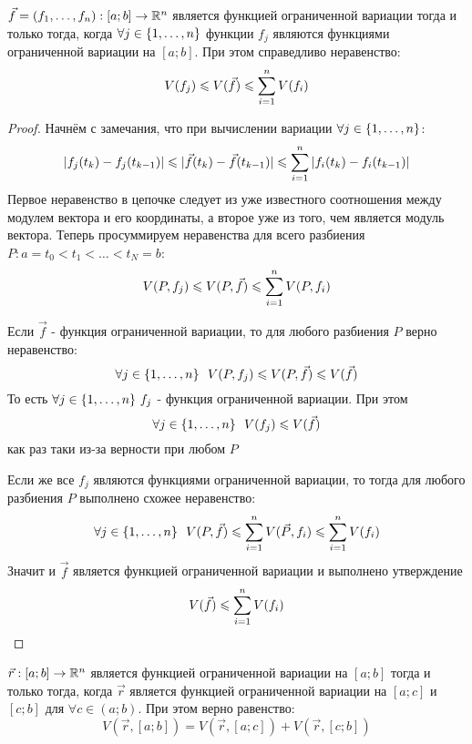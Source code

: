 \begin{lemma} \label{6lemma}
	$\vec{f} = (f_1, \ldots, f_n): [a; b] \to \mathbb{R}^n$ является функцией ограниченной вариации тогда и только тогда, когда $\forall j \in \{1, \ldots, n\}$ функции $f_j$ являются функциями ограниченной вариации на $[a; b]$. При этом справедливо неравенство:
	\[
		V(f_j) \leqslant V(\vec{f}) \leqslant \sum\limits_{i = 1}^n V(f_i)
	\]
\end{lemma}

\begin{proof}
	Начнём с замечания, что при вычислении вариации $\forall j \in \{1, \ldots, n\}$:
	\[
		|f_j(t_k) - f_j(t_{k - 1})| \leqslant |\vec{f}(t_k) - \vec{f}(t_{k - 1})| \leqslant \sum\limits_{i = 1}^n |f_i(t_k) - f_i(t_{k - 1})|
	\]
	Первое неравенство в цепочке следует из уже известного соотношения между модулем вектора и его координаты, а второе уже из того, чем является модуль вектора. Теперь просуммируем неравенства для всего разбиения $P: a = t_0 < t_1 < \ldots < t_N = b$:
	\[
		V(P, f_j) \leqslant V(P, \vec{f}) \leqslant \sum\limits_{i = 1}^n V(P, f_i)
	\]
	
	Если $\vec{f}$ - функция ограниченной вариации, то для любого разбиения $P$ верно неравенство:
	\[
		\forall j \in \range{n}\ \ V(P, f_j) \le V(P, \vec{f}) \le V(\vec{f})
	\]
	То есть $\forall j \in \{1, \ldots, n\}\ f_j$ - функция ограниченной вариации. При этом
	\[
		\forall j \in \{1, \ldots, n\}\ \ V(f_j) \leqslant V(\vec{f})
	\]
	как раз таки из-за верности при любом $P$
	
	Если же все $f_j$ являются функциями ограниченной вариации, то тогда для любого разбиения $P$ выполнено схожее неравенство:
	\[
		\forall j \in \{1, \ldots, n\}\ \ V(P, \vec{f}) \leqslant \sum\limits_{i = 1}^n V(\vec{P}, f_i) \leqslant \sum\limits_{i = 1}^n V(f_i)
	\]
	Значит и $\vec{f}$ является функцией ограниченной вариации и выполнено утверждение
	\[
		V(\vec{f}) \leqslant \sum\limits_{i = 1}^n V(f_i)
	\]
\end{proof}

\begin{lemma} \label{7lemma}
	$\vec{r}: [a; b] \to \mathbb{R}^n$ является функцией ограниченной вариации на $[a; b]$ тогда и только тогда, когда $\vec{r}$ является функцией ограниченной вариации на $[a; c]$ и $[c; b]$ для $\forall c \in (a; b)$. При этом верно равенство:
	\[
		V(\vec{r}, [a; b]) = V(\vec{r}, [a; c]) + V(\vec{r}, [c; b])
	\]
\end{lemma}


